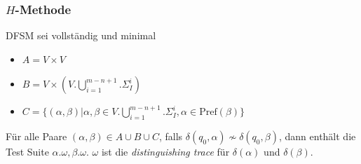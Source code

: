 \documentclass[10pt]{beamer}
\begin{document}
\begin{frame}
  \frametitle{$H$-Methode}
  DFSM sei vollständig und minimal
  \begin{itemize}
    \item $A=V\times V$
  	\item $B=V\times (V.\bigcup\limits_{i=1}^{m-n+1}.\Sigma_I^i)$
  	\item $C=\{(\alpha,\beta)|\alpha,\beta\in V.\bigcup\limits_{i=1}^{m-n+1}.\Sigma_I^i, \alpha \in \text{Pref}(\beta)\}$
  \end{itemize}
  Für alle Paare $(\alpha, \beta) \in A\cup B \cup C$, falls $\delta(q_0,\alpha) \not \sim \delta(q_0,\beta)$, dann enthält die Test Suite $\alpha.\omega,\beta.\omega$. $\omega$ ist die \emph{distinguishing trace} für $\delta(\alpha)$ und $\delta(\beta)$.
\end{frame}
\end{document}
